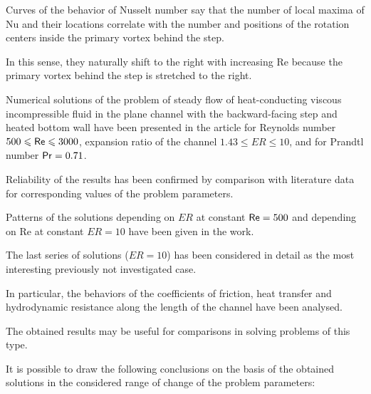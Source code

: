 Curves of the behavior of Nusselt number say that the number of local maxima of {\sf Nu} and their locations correlate with the number and positions of the rotation centers inside the primary vortex behind the step. 

In this sense, they naturally shift to the right with increasing {\sf  Re} because the primary vortex behind the step is stretched to the right.





\smallskip




Numerical solutions of the problem of steady flow of heat-con\-duc\-ting viscous incompressible fluid in the plane channel with the backward-facing step and heated bottom wall have been presented in the article for Reynolds number \mbox{$500 \leqslant {\sf Re} \leqslant 3000$}, expansion ratio of the channel \mbox{$1.43 \leqslant ER \leqslant 10$}, and for Prandtl number ${\sf Pr}=0.71$. 

Reliability of the results has been confirmed by comparison with literature data for corresponding values of the problem parameters. 



Patterns of the solutions depending on $ER$ at constant \mbox{${\sf Re}=500$} and depending on {\sf Re} at constant $ER=10$ have been given in the work. 

The last series of solutions ($ER=10$) has been considered in detail as the most interesting previously not investigated case. 

In particular, the behaviors of the coefficients of friction, heat transfer and hydrodynamic resistance along the length of the channel have been analysed. 

The obtained results may be useful for comparisons in solving problems of this type.



It is possible to draw the following conclusions on the basis of the obtained solutions in the considered range of change of the problem parameters:




